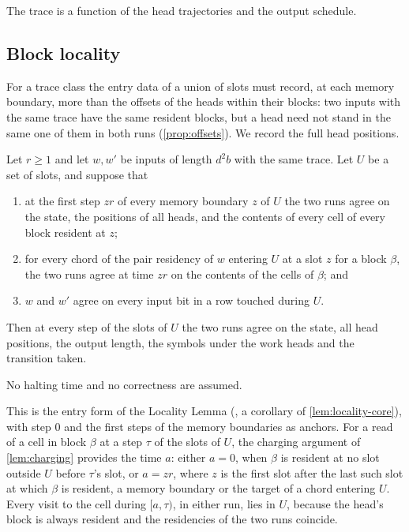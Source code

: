\begin{outline}
The trace is a function of the head trajectories and the output schedule.
\end{outline}

\subsection{Block locality}

For a trace class the entry data of a union of slots must record, at each memory boundary, more than
the offsets of the heads within their blocks: two inputs with the same trace have the same resident blocks,
but a head need not stand in the same one of them in both runs (\cref{prop:offsets}). We record the full
head positions.

\begin{lemma}\label{lem:block-locality}
Let $r\ge1$ and let $w,w'$ be inputs of length $d^2b$ with the same trace. Let $U$ be a set of
slots, and suppose that
\begin{enumerate}[label=(\roman*)]
\item at the first step $zr$ of every memory boundary $z$ of $U$ the two runs agree on the state,
the positions of all heads, and the contents of every cell of every block resident at $z$;
\item for every chord of the pair residency of $w$ entering $U$ at a slot $z$ for a block $\beta$,
the two runs agree at time $zr$ on the contents of the cells of $\beta$; and
\item $w$ and $w'$ agree on every input bit in a row touched during $U$.
\end{enumerate}
Then at every step of the slots of $U$ the two runs agree on the state, all head positions, the
output length, the symbols under the work heads and the transition taken.
\end{lemma}

No halting time and no correctness are assumed.

\begin{outline}
This is the entry form of the Locality Lemma (, a corollary of
\cref{lem:locality-core}), with step $0$ and the first steps of the memory boundaries as anchors.
For a read of a cell in block $\beta$ at a step $\tau$ of the slots of $U$, the charging argument
of \cref{lem:charging} provides the time $a$: either $a=0$, when $\beta$ is resident at no slot
outside $U$ before $\tau$'s slot, or $a=zr$, where $z$ is the first slot after the last such slot
at which $\beta$ is resident, a memory boundary or the target of a chord entering $U$. Every visit
to the cell during $[a,\tau)$, in either run, lies in $U$, because the head's block is always
resident and the residencies of the two runs coincide.
\end{outline}

